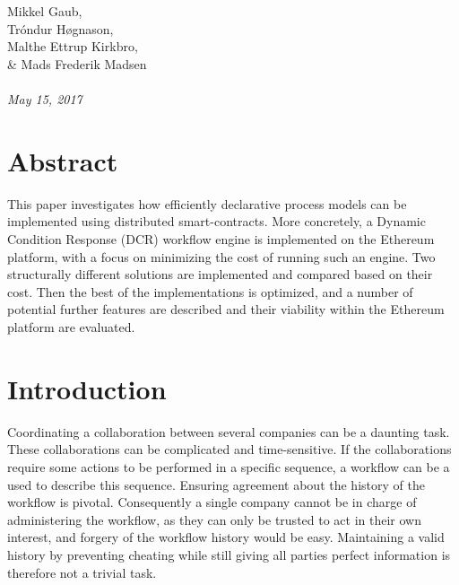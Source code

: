 \documentclass{article}
\begin{document}
\normalem
{}
	\begin{titlepage}
		 \\ \\
		Mikkel Gaub, \\ Tróndur Høgnason, \\ Malthe Ettrup Kirkbro, \\ \& Mads Frederik Madsen	\\ \\
		\hspace{-18pt}
		\textit{May 15, 2017}
		\vspace{\fill}
		\section*{Abstract}
		This paper investigates how efficiently declarative process models can be implemented using distributed smart-contracts. 
		More concretely, a Dynamic Condition Response (DCR) workflow engine is implemented on the Ethereum platform, with a focus on minimizing the cost of running such an engine. 
		Two structurally different solutions are implemented and compared based on their cost.
		Then the best of the implementations is optimized, and a number of potential further features are described and their viability within the Ethereum platform are evaluated.
		\thispagestyle{empty}
	\end{titlepage}
	\clearpage

	\setcounter{page}{1}

	\setcounter{tocdepth}{2}
	\tableofcontents
	\pagebreak

	\section{Introduction}
	Coordinating a collaboration between several companies can be a daunting task.
	These collaborations can be complicated and time-sensitive.
	If the collaborations require some actions to be performed in a specific sequence, a workflow can be a used to describe this sequence.
	Ensuring agreement about the history of the workflow is pivotal.
	Consequently a single company cannot be in charge of administering the workflow, as they can only be trusted to act in their own interest, and forgery of the workflow history would be easy.
	Maintaining a valid history by preventing cheating while still giving all parties perfect information is therefore not a trivial task.
\end{document}
